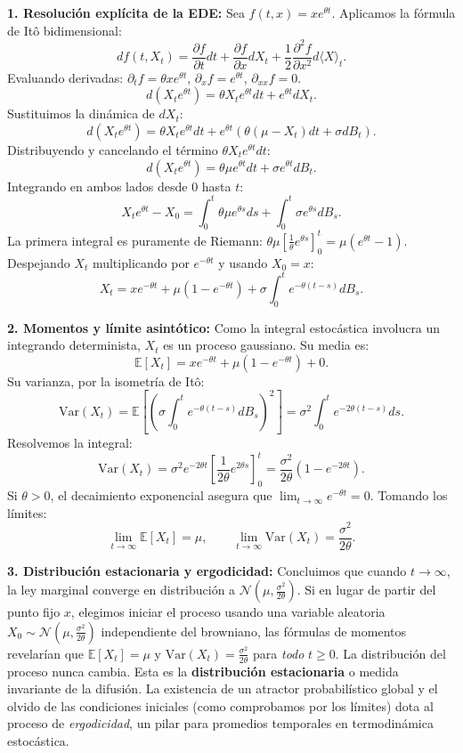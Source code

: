 \documentclass[11pt, letterpaper]{article}
\begin{document}
\begin{solucion}
    \textbf{1. Resolución explícita de la EDE:}
    Sea $f(t, x) = x e^{\theta t}$. Aplicamos la fórmula de Itô bidimensional:
    \[ df(t, X_t) = \frac{\partial f}{\partial t} dt + \frac{\partial f}{\partial x} dX_t + \frac{1}{2}\frac{\partial^2 f}{\partial x^2} d\langle X \rangle_t. \]
    Evaluando derivadas: $\partial_t f = \theta x e^{\theta t}$, $\partial_x f = e^{\theta t}$, $\partial_{xx} f = 0$.
    \[ d(X_t e^{\theta t}) = \theta X_t e^{\theta t} dt + e^{\theta t} dX_t. \]
    Sustituimos la dinámica de $dX_t$:
    \[ d(X_t e^{\theta t}) = \theta X_t e^{\theta t} dt + e^{\theta t} \left( \theta(\mu - X_t) dt + \sigma dB_t \right). \]
    Distribuyendo y cancelando el término $\theta X_t e^{\theta t} dt$:
    \[ d(X_t e^{\theta t}) = \theta \mu e^{\theta t} dt + \sigma e^{\theta t} dB_t. \]
    Integrando en ambos lados desde $0$ hasta $t$:
    \[ X_t e^{\theta t} - X_0 = \int_0^t \theta \mu e^{\theta s} ds + \int_0^t \sigma e^{\theta s} dB_s. \]
    La primera integral es puramente de Riemann: $\theta \mu \left[ \frac{1}{\theta} e^{\theta s} \right]_0^t = \mu (e^{\theta t} - 1)$.
    Despejando $X_t$ multiplicando por $e^{-\theta t}$ y usando $X_0 = x$:
    \[ X_t = x e^{-\theta t} + \mu (1 - e^{-\theta t}) + \sigma \int_0^t e^{-\theta(t-s)} dB_s. \]

    \textbf{2. Momentos y límite asintótico:}
    Como la integral estocástica involucra un integrando determinista, $X_t$ es un proceso gaussiano.
    Su media es:
    \[ \mathbb{E}[X_t] = x e^{-\theta t} + \mu (1 - e^{-\theta t}) + 0. \]
    Su varianza, por la isometría de Itô:
    \[ \text{Var}(X_t) = \mathbb{E}\left[ \left( \sigma \int_0^t e^{-\theta(t-s)} dB_s \right)^2 \right] = \sigma^2 \int_0^t e^{-2\theta(t-s)} ds. \]
    Resolvemos la integral:
    \[ \text{Var}(X_t) = \sigma^2 e^{-2\theta t} \left[ \frac{1}{2\theta} e^{2\theta s} \right]_0^t = \frac{\sigma^2}{2\theta} (1 - e^{-2\theta t}). \]
    Si $\theta > 0$, el decaimiento exponencial asegura que $\lim_{t \to \infty} e^{-\theta t} = 0$. Tomando los límites:
    \[ \lim_{t \to \infty} \mathbb{E}[X_t] = \mu, \qquad \lim_{t \to \infty} \text{Var}(X_t) = \frac{\sigma^2}{2\theta}. \]

    \textbf{3. Distribución estacionaria y ergodicidad:}
    Concluimos que cuando $t \to \infty$, la ley marginal converge en distribución a $\mathcal{N}\left(\mu, \frac{\sigma^2}{2\theta}\right)$.
    Si en lugar de partir del punto fijo $x$, elegimos iniciar el proceso usando una variable aleatoria $X_0 \sim \mathcal{N}\left(\mu, \frac{\sigma^2}{2\theta}\right)$ independiente del browniano, las fórmulas de momentos revelarían que $\mathbb{E}[X_t] = \mu$ y $\text{Var}(X_t) = \frac{\sigma^2}{2\theta}$ para \textit{todo} $t \ge 0$. La distribución del proceso nunca cambia.
    Esta es la \textbf{distribución estacionaria} o medida invariante de la difusión. La existencia de un atractor probabilístico global y el olvido de las condiciones iniciales (como comprobamos por los límites) dota al proceso de \textit{ergodicidad}, un pilar para promedios temporales en termodinámica estocástica.
\end{solucion}
\end{document}
